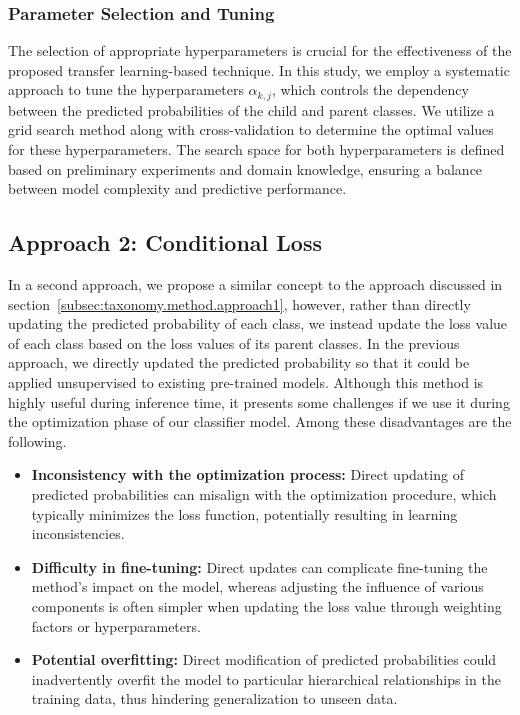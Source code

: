 \subsubsection{Parameter Selection and Tuning}
The selection of appropriate hyperparameters is crucial for the effectiveness of the proposed transfer learning-based technique. In this study, we employ a systematic approach to tune the hyperparameters $\alpha_{k,j} $, which controls the dependency between the predicted probabilities of the child and parent classes. We utilize a grid search method along with cross-validation to determine the optimal values for these hyperparameters. The search space for both hyperparameters is defined based on preliminary experiments and domain knowledge, ensuring a balance between model complexity and predictive performance.

\subsection{Approach 2: Conditional Loss}\label{subsec:taxonomy.method.approach2}
In a second approach, we propose a similar concept to the approach discussed in section~\ref{subsec:taxonomy.method.approach1}, however, rather than directly updating the predicted probability of each class, we instead update the loss value of each class based on the loss values of its parent classes. In the previous approach, we directly updated the predicted probability so that it could be applied unsupervised to existing pre-trained models. Although this method is highly useful during inference time, it presents some challenges if we use it during the optimization phase of our classifier model. Among these disadvantages are the following.
\begin{itemize}
    \item \textbf{Inconsistency with the optimization process: } Direct updating of predicted probabilities can misalign with the optimization procedure, which typically minimizes the loss function, potentially resulting in learning inconsistencies.
    \item \textbf{Difficulty in fine-tuning:} Direct updates can complicate fine-tuning the method's impact on the model, whereas adjusting the influence of various components is often simpler when updating the loss value through weighting factors or hyperparameters.
    \item \textbf{Potential overfitting:} Direct modification of predicted probabilities could inadvertently overfit the model to particular hierarchical relationships in the training data, thus hindering generalization to unseen data.
\end{itemize}

